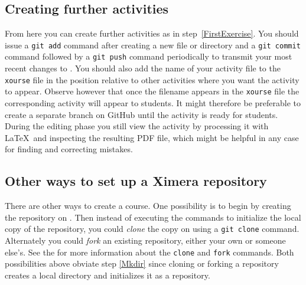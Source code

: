 \documentclass{ximera}
\begin{document}
\subsection{Creating further activities}
From here you can create further 
activities as in step~\autoref{FirstExercise}.	You should issue a
\verb!git add! command after creating a new file or directory and a
\verb!git commit!  command followed by a \verb!git push! command
periodically to transmit your most recent changes to
.  You should also add the name of
your activity file to the \verb!xourse! file in the position relative
to other activities where you want the activity to appear.  Observe
however that once the filename appears in the \verb!xourse!  file the
corresponding activity will appear to students. It might therefore be
preferable to create a separate branch on GitHub until the activity is
ready for students.  During the editing phase you still view the
activity by processing it with \LaTeX\ and inspecting the resulting
PDF file, which might be helpful in any case for finding and
correcting mistakes.

\subsection{Other ways to set up a Ximera repository}\label{ForkClone}
There are other ways to create a 
course.  One possibility is to begin by creating the repository on
.  Then instead of executing the commands
to
initialize the local copy of the repository, you could {\em clone} the
copy on  using a \verb!git clone!
command.  Alternately you could {\em fork} an existing repository,
either your own or someone else's.  See the  for more information about the
\verb!clone! and \verb!fork! commands.	Both possibilities above
obviate step \autoref{Mkdir} since cloning or forking a
 repository creates a local directory
and initializes it as a  repository.
\end{document}
